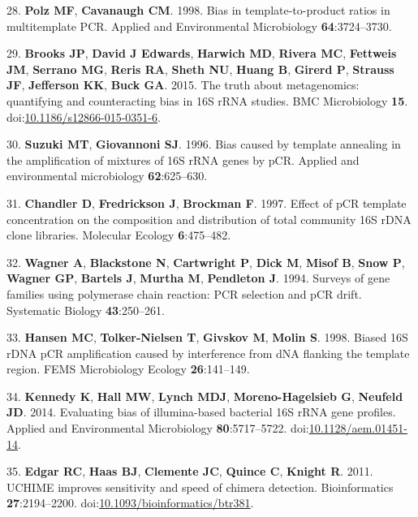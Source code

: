 \documentclass[11,]{article}
\begin{document}
28. \textbf{Polz MF}, \textbf{Cavanaugh CM}. 1998. Bias in
template-to-product ratios in multitemplate PCR. Applied and
Environmental Microbiology \textbf{64}:3724--3730.

29. \textbf{Brooks JP}, \textbf{David J Edwards}, \textbf{Harwich MD},
\textbf{Rivera MC}, \textbf{Fettweis JM}, \textbf{Serrano MG},
\textbf{Reris RA}, \textbf{Sheth NU}, \textbf{Huang B}, \textbf{Girerd
P}, \textbf{Strauss JF}, \textbf{Jefferson KK}, \textbf{Buck GA}. 2015.
The truth about metagenomics: quantifying and counteracting bias in 16S
rRNA studies. BMC Microbiology \textbf{15}.
doi:\href{http://dx.doi.org/10.1186/s12866-015-0351-6}{10.1186/s12866-015-0351-6}.

30. \textbf{Suzuki MT}, \textbf{Giovannoni SJ}. 1996. Bias caused by
template annealing in the amplification of mixtures of 16S rRNA genes by
pCR. Applied and environmental microbiology \textbf{62}:625--630.

31. \textbf{Chandler D}, \textbf{Fredrickson J}, \textbf{Brockman F}.
1997. Effect of pCR template concentration on the composition and
distribution of total community 16S rDNA clone libraries. Molecular
Ecology \textbf{6}:475--482.

32. \textbf{Wagner A}, \textbf{Blackstone N}, \textbf{Cartwright P},
\textbf{Dick M}, \textbf{Misof B}, \textbf{Snow P}, \textbf{Wagner GP},
\textbf{Bartels J}, \textbf{Murtha M}, \textbf{Pendleton J}. 1994.
Surveys of gene families using polymerase chain reaction: PCR selection
and pCR drift. Systematic Biology \textbf{43}:250--261.

33. \textbf{Hansen MC}, \textbf{Tolker-Nielsen T}, \textbf{Givskov M},
\textbf{Molin S}. 1998. Biased 16S rDNA pCR amplification caused by
interference from dNA flanking the template region. FEMS Microbiology
Ecology \textbf{26}:141--149.

34. \textbf{Kennedy K}, \textbf{Hall MW}, \textbf{Lynch MDJ},
\textbf{Moreno-Hagelsieb G}, \textbf{Neufeld JD}. 2014. Evaluating bias
of illumina-based bacterial 16S rRNA gene profiles. Applied and
Environmental Microbiology \textbf{80}:5717--5722.
doi:\href{http://dx.doi.org/10.1128/aem.01451-14}{10.1128/aem.01451-14}.

35. \textbf{Edgar RC}, \textbf{Haas BJ}, \textbf{Clemente JC},
\textbf{Quince C}, \textbf{Knight R}. 2011. UCHIME improves sensitivity
and speed of chimera detection. Bioinformatics \textbf{27}:2194--2200.
doi:\href{http://dx.doi.org/10.1093/bioinformatics/btr381}{10.1093/bioinformatics/btr381}.
\end{document}
